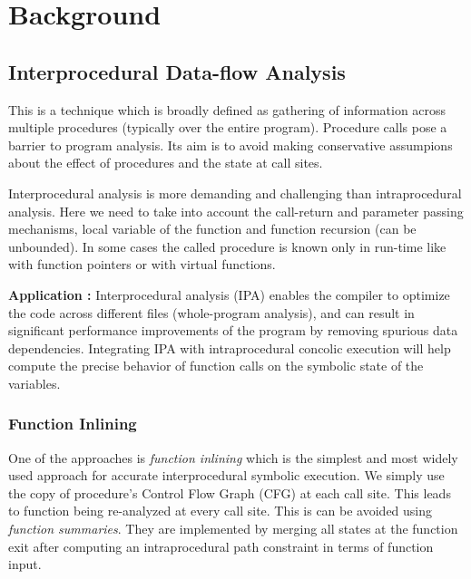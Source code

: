 \documentclass[12pt,oneside]{book}
\begin{document}

\newpage
\chapter{Background}


\section {Interprocedural Data-flow Analysis}
This is a technique which is broadly defined as gathering of information across multiple procedures (typically over the entire program). Procedure calls pose a barrier to program analysis. Its aim is to avoid making conservative assumpions about the effect of procedures and the state at call sites.

Interprocedural analysis\cite{pnueli} is more demanding and challenging than intraprocedural analysis. Here we need to take into account the call-return and parameter passing mechanisms, local variable of the function and function recursion (can be unbounded). In some cases the called procedure is known only in run-time like with function pointers or with virtual functions. 

\textbf{Application :} Interprocedural analysis (IPA) enables the compiler to optimize the code across different files (whole-program analysis), and can result in significant performance improvements of the program by removing spurious data dependencies. Integrating IPA with intraprocedural concolic execution will help compute the precise behavior of function calls on the symbolic state of the variables.


\subsection {Function Inlining}
One of the approaches is \textit{function inlining}\cite{ipa1} which is the simplest and most widely used approach for accurate interprocedural symbolic execution. We simply use the copy of procedure's Control Flow Graph (CFG) at each call site. This leads to function being re-analyzed at every call site. This is can be avoided using \textit{function summaries}. They are implemented by merging all states at the function exit after computing an intraprocedural path constraint in terms of function input.\\ 
\end{document}
